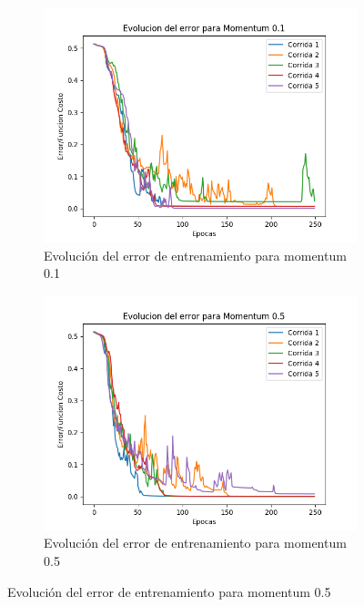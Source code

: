 \begin{figure}[!htbp]
\centering
\begin{subfigure}{.5\textwidth}
  \centering
  \includegraphics[width=1\linewidth]{graficos/momentum_0_1.png}
  \caption{Evolución del error de entrenamiento para momentum 0.1}
  \label{fig:sub1}
\end{subfigure}%
\begin{subfigure}{.5\textwidth}
  \centering
  \includegraphics[width=1\linewidth]{graficos/momentum_0_5.png}
  \caption{Evolución del error de entrenamiento para momentum 0.5}
  \label{fig:sub2}
\end{subfigure}
\end{figure}

